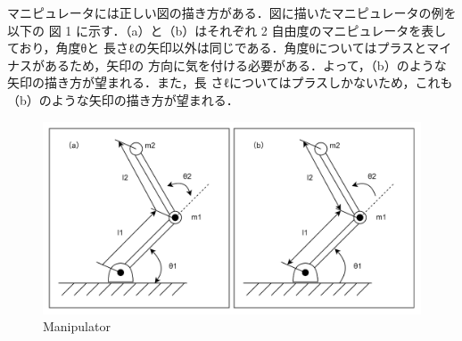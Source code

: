 
マニピュレータには正しい図の描き方がある．図に描いたマニピュレータの例を以下の
図 1 に示す．（a）と（b）はそれぞれ 2 自由度のマニピュレータを表しており，角度θと
長さℓの矢印以外は同じである．角度θについてはプラスとマイナスがあるため，矢印の
方向に気を付ける必要がある．よって，（b）のような矢印の描き方が望まれる．また，長
さℓについてはプラスしかないため，これも（b）のような矢印の描き方が望まれる．
\begin{figure}[hbtp]
  \centering
 \includegraphics[keepaspectratio, scale=0.8]
      {images/mani.png}
 \caption{Manipulator}
 \label{Fig:manipulator}
\end{figure}

\newpage
